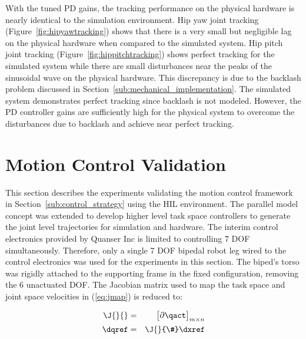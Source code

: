 
With the tuned PD gains, the tracking performance on the physical hardware is nearly identical to the simulation environment. Hip yaw joint tracking (Figure~\ref{fig:hipyawtracking}) shows that there is a very small but negligible lag on the physical hardware when compared to the simulated system. Hip pitch joint tracking (Figure~\ref{fig:hippitchtracking}) shows perfect tracking for the simulated system while there are small disturbances near the peaks of the sinusoidal wave on the physical hardware. This discrepancy is due to the backlash problem discussed in Section~\ref{sub:mechanical_implementation}. The simulated system demonstrates perfect tracking since backlash is not modeled. However, the PD controller gains are sufficiently high for the physical system to overcome the disturbances due to backlash and achieve near perfect tracking. 



\section{Motion Control Validation} %
\label{sec:motion_control_validation}
This section describes the experiments validating the motion control framework in Section~\ref{sub:control_strategy} using the HIL environment. The parallel model concept was extended to develop higher level task space controllers to generate the joint level trajectories for simulation and hardware. The interim control electronics provided by Quanser Inc is limited to controlling 7 DOF simultaneously. Therefore, only a single 7 DOF bipedal robot leg wired to the control electronics was used for the experiments in this section. The biped's torso was rigidly attached to the supporting frame in the fixed configuration, removing the 6 unactuated DOF. The Jacobian matrix used to map the task space and joint space velocities in (\ref{eq:jmap}) is reduced to: 

\begin{eqnarray}
	\J{}{} &=& \begin{bmatrix} \partial \qact \\ \end{bmatrix}_{m \times n} \\
	\dqref &=& \J{}{\#} \dxref \label{eq:calcqref}
\end{eqnarray}

